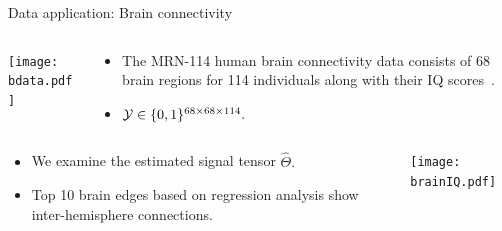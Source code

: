\documentclass[10pt, mathserif]{beamer} %
\theoremstyle{definition}
\theoremstyle{plain}
\begin{document}
\begin{frame}{Data application: Brain connectivity}
\begin{columns}
\begin{column}{0.21\textwidth}
   \begin{center}
     \texttt{[image: bdata.pdf]}
     \end{center}
\end{column}
\begin{column}{0.7\textwidth} 
\begin{itemize}
    \item The MRN-114 human brain connectivity data consists of 68 brain regions for 114 individuals along with their IQ scores~\citep{wang2017bayesian}.
    \item  $\mathcal{Y}\in\{0,1\}^{68\times68\times114}.$
\end{itemize}
\end{column}
\end{columns}

\begin{columns}
\begin{column}{0.6\textwidth}
 \begin{itemize}
     \item We examine the estimated signal tensor $\hat\Theta.$
     \item Top 10 brain edges based on regression analysis show inter-hemisphere connections.
 \end{itemize}
\end{column}
\begin{column}{0.4\textwidth} 
   \begin{center}
     \texttt{[image: brainIQ.pdf]}
     \end{center}
\end{column}
\end{columns}

\end{frame}
\end{document}
